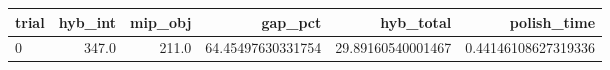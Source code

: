 \begin{tabular}{lrrrrr}
\hline
trial & hyb_int & mip_obj & gap_pct & hyb_total & polish_time \\ \hline
0 & 347.0 & 211.0 & 64.45497630331754 & 29.89160540001467 & 0.44146108627319336 \\
\hline
\end{tabular}
